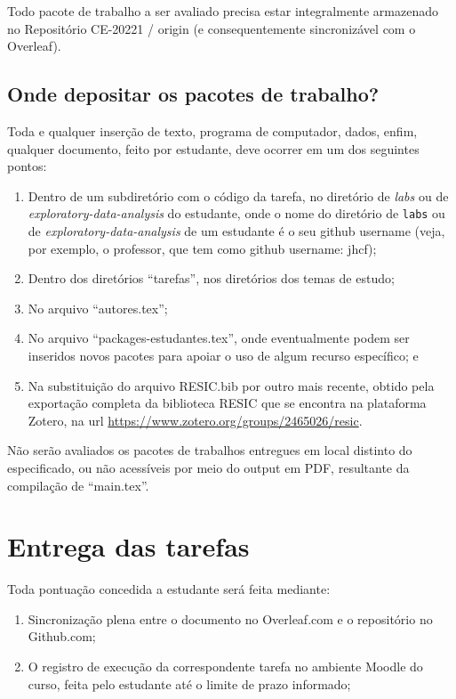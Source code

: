 Todo pacote de trabalho a ser avaliado precisa estar integralmente armazenado no Repositório CE-20221 / origin (e consequentemente sincronizável com o Overleaf).

\subsection{Onde depositar os pacotes de trabalho?}

Toda e qualquer inserção de texto, programa de computador, dados, enfim, qualquer documento, feito por estudante, deve ocorrer em um dos seguintes pontos:
\begin{enumerate}
    \item Dentro de um subdiretório com o código da tarefa, no diretório de \textit{labs} ou de \textit{exploratory-data-analysis} do estudante, onde o nome do diretório de \texttt{labs} ou de \textit{exploratory-data-analysis} de um estudante é o seu github username (veja, por exemplo, o professor, que tem como github username: jhcf);
    \item Dentro dos diretórios ``tarefas'', nos diretórios dos temas de estudo;
    \item No arquivo ``autores.tex'';
    \item No arquivo ``packages-estudantes.tex'', onde eventualmente podem ser inseridos novos pacotes para apoiar o uso de algum recurso específico; e
    \item Na substituição do arquivo RESIC.bib por outro mais recente, obtido pela exportação completa da biblioteca RESIC que se encontra na plataforma Zotero, na url \url{https://www.zotero.org/groups/2465026/resic}.
\end{enumerate}

Não serão avaliados os pacotes de trabalhos entregues em local distinto do especificado, ou não acessíveis por meio do output em PDF, resultante da compilação de ``main.tex''.

\section{Entrega das tarefas}

Toda pontuação concedida a estudante será feita mediante:
\begin{enumerate}
    \item Sincronização plena entre o documento no Overleaf.com e o repositório no Github.com;
    \item O registro de execução da correspondente tarefa no ambiente Moodle do curso, feita pelo estudante até o limite de prazo informado;
\end{enumerate}

